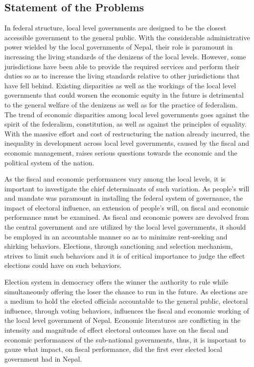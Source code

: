 \subsection{Statement of the Problems}
In federal structure, local level governments are designed to be the closest accessible government to the general public. With the considerable administrative power wielded by the local governments of Nepal, their role is paramount in increasing the living standards of the denizens of the local levels. However, some jurisdictions have been able to provide the required services and perform their duties so as to increase the living standards relative to other jurisdictions that have fell behind. Existing disparities as well as the workings of the local level governments that could worsen the economic equity in the future is detrimental to the general welfare of the denizens as well as for the practice of federalism. The trend of economic disparities among local level governments goes against the spirit of the federalism, constitution, as well as against the principles of equality. With the massive effort and cost of restructuring the nation already incurred, the inequality in development across local level governments, caused by the fiscal and economic management, raises serious questions towards the economic and the political system of the nation. \par
As the fiscal and economic performances vary among the local levels, it is important to investigate the chief determinants of such variation. As people's will and mandate was paramount in installing the federal system of governance, the impact of electoral influence, an extension of people's will, on fiscal and economic performance must be examined. As fiscal and economic powers are devolved from the central government and are utilized by the local level governments, it should be employed in an accountable manner so as to minimize rent-seeking and shirking behaviors. Elections, through sanctioning and selection mechanism, strives to limit such behaviors and it is of critical importance to judge the effect elections could have on such behaviors.  \par
Election system in democracy offers the winner the authority to rule while simultaneously offering the loser the chance to run in the future\cite{Przeworski1999}. As elections are a medium to hold the elected officials accountable to the general public, electoral influence, through voting behaviors, influences the fiscal and economic working of the local level government of Nepal. Economic literatures are conflicting in the intensity and magnitude of effect electoral outcomes have on the fiscal and economic performances of the sub-national governments, thus, it is important to gauze what impact, on fiscal performance, did the first ever elected local government had in  Nepal.  \vspace{-3mm}

